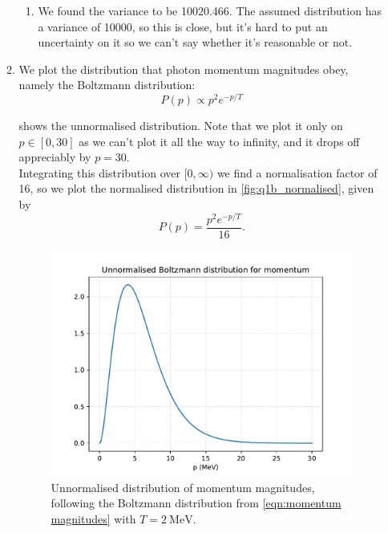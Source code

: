 \documentclass[11pt]{article}
\begin{document}
\begin{enumerate}
\begin{enumerate}
\begin{enumerate}
            \item We found the variance to be \num{10020.466}. The assumed distribution has a variance of \num{10000}, so this is close, but it's hard to put an uncertainty on it so we can't say whether it's reasonable or not.
        \end{enumerate}

        \item We plot the distribution that photon momentum magnitudes obey, namely the Boltzmann distribution:
        \begin{equation}
            P(p)\propto p^2 e^{-p/T}
            \label{eqn:momentum magnitudes}
        \end{equation}

         shows the unnormalised distribution. Note that we plot it only on $p\in[0,30]$ as we can't plot it all the way to infinity, and it drops off appreciably by $p=30$. \\
        Integrating this distribution over $[0,\infty)$ we find a normalisation factor of 16, so we plot the normalised distribution in \cref{fig:q1b_normalised}, given by 
        \begin{equation}
            P(p)=\frac{p^2 e^{-p/T}}{16}.
            \label{eqn:boltzmann normalised}
        \end{equation}

        \begin{figure}[H]
            \begin{center}
                \includegraphics[width=.6\textwidth]{Plots/q1b_unnormalised.pdf}
                \caption{Unnormalised distribution of momentum magnitudes, following the Boltzmann distribution from \cref{eqn:momentum magnitudes} with $T=\SI{2}{\mega\electronvolt}$. }
                \label{fig:q1b_unnormalised}
            \end{center}
        \end{figure}


\end{enumerate}
\end{enumerate}
\end{document}
